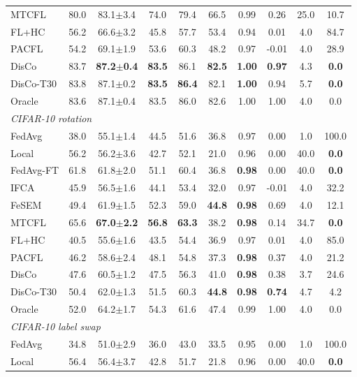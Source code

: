 \begin{tabular}{lccccccccc}
MTCFL & 80.0 & 83.1$\pm$3.4 & 74.0 & 79.4 & 66.5 & 0.99 & 0.26 & 25.0 & 10.7 \\
FL+HC & 56.2 & 66.6$\pm$3.2 & 45.8 & 57.7 & 53.4 & 0.94 & 0.01 & 4.0 & 84.7 \\
PACFL & 54.2 & 69.1$\pm$1.9 & 53.6 & 60.3 & 48.2 & 0.97 & -0.01 & 4.0 & 28.9 \\
DisCo & 83.7 & \textbf{87.2$\pm$0.4} & \textbf{83.5} & 86.1 & \textbf{82.5} & \textbf{1.00} & \textbf{0.97} & 4.3 & \textbf{0.0} \\
DisCo-T30 & 83.8 & 87.1$\pm$0.2 & \textbf{83.5} & \textbf{86.4} & 82.1 & \textbf{1.00} & 0.94 & 5.7 & \textbf{0.0} \\
Oracle & 83.6 & 87.1$\pm$0.4 & 83.5 & 86.0 & 82.6 & 1.00 & 1.00 & 4.0 & 0.0 \\
\midrule
\multicolumn{10}{l}{\textit{CIFAR-10 rotation}}\\
FedAvg & 38.0 & 55.1$\pm$1.4 & 44.5 & 51.6 & 36.8 & 0.97 & 0.00 & 1.0 & 100.0 \\
Local & 56.2 & 56.2$\pm$3.6 & 42.7 & 52.1 & 21.0 & 0.96 & 0.00 & 40.0 & \textbf{0.0} \\
FedAvg-FT & 61.8 & 61.8$\pm$2.0 & 51.1 & 60.4 & 36.8 & \textbf{0.98} & 0.00 & 40.0 & \textbf{0.0} \\
IFCA & 45.9 & 56.5$\pm$1.6 & 44.1 & 53.4 & 32.0 & 0.97 & -0.01 & 4.0 & 32.2 \\
FeSEM & 49.4 & 61.9$\pm$1.5 & 52.3 & 59.0 & \textbf{44.8} & \textbf{0.98} & 0.69 & 4.0 & 12.1 \\
MTCFL & 65.6 & \textbf{67.0$\pm$2.2} & \textbf{56.8} & \textbf{63.3} & 38.2 & \textbf{0.98} & 0.14 & 34.7 & \textbf{0.0} \\
FL+HC & 40.5 & 55.6$\pm$1.6 & 43.5 & 54.4 & 36.9 & 0.97 & 0.01 & 4.0 & 85.0 \\
PACFL & 46.2 & 58.6$\pm$2.4 & 48.1 & 54.8 & 37.3 & \textbf{0.98} & 0.37 & 4.0 & 21.2 \\
DisCo & 47.6 & 60.5$\pm$1.2 & 47.5 & 56.3 & 41.0 & \textbf{0.98} & 0.38 & 3.7 & 24.6 \\
DisCo-T30 & 50.4 & 62.0$\pm$1.3 & 51.5 & 60.3 & \textbf{44.8} & \textbf{0.98} & \textbf{0.74} & 4.7 & 4.2 \\
Oracle & 52.0 & 64.2$\pm$1.7 & 54.3 & 61.6 & 47.4 & 0.99 & 1.00 & 4.0 & 0.0 \\
\midrule
\multicolumn{10}{l}{\textit{CIFAR-10 label swap}}\\
FedAvg & 34.8 & 51.0$\pm$2.9 & 36.0 & 43.0 & 33.5 & 0.95 & 0.00 & 1.0 & 100.0 \\
Local & 56.4 & 56.4$\pm$3.7 & 42.8 & 51.7 & 21.8 & 0.96 & 0.00 & 40.0 & \textbf{0.0} \\

\end{tabular}
